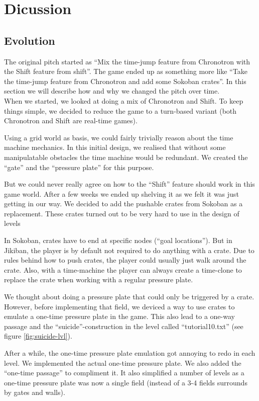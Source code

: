\section{Dicussion} 

\subsection{Evolution}
The original pitch started as ``Mix the time-jump feature from
Chronotron with the Shift feature from shift''.  The game ended up as
something more like ``Take the time-jump feature from Chronotron and
add some Sokoban crates''.  In this section we will describe how and why
we changed the pitch over time.\\


When we started, we looked at doing a mix of Chronotron and Shift.  To
keep things simple, we decided to reduce the game to a turn-based
variant (both Chronotron and Shift are real-time games).

Using a grid world as basis, we could fairly trivially reason about
the time machine mechanics.  In this initial design, we realised that
without some manipulatable obstacles the time machine would be
redundant.  We created the ``gate'' and the ``pressure plate'' for
this purpose.

But we could never really agree on how to the ``Shift'' feature should
work in this game world.  After a few weeks we ended up shelving it as
we felt it was just getting in our way.  We decided to add the
pushable crates from Sokoban as a replacement.  These crates turned out
to be very hard to use in the design of levels

In Sokoban, crates have to end at specific nodes (``goal locations'').
But in Jikiban, the player is by default not required to do anything
with a crate.  Due to rules behind how to push crates, the player
could usually just walk around the crate.  Also, with a time-machine
the player can always create a time-clone to replace the crate when
working with a regular pressure plate.

We thought about doing a pressure plate that could only be triggered
by a crate.  However, before implementing that field, we deviced a way
to use crates to emulate a one-time pressure plate in the game.  This
also lead to a one-way passage and the ``suicide''-construction in the
level called ``tutorial10.txt'' (see figure \ref{fig:suicide-lvl}).

After a while, the one-time pressure plate emulation got annoying to
redo in each level.  We implemented the actual one-time pressure
plate. We also added the ``one-time passage'' to compliment it.  It
also simplified a number of levels as a one-time pressure plate was
now a single field (instead of a 3-4 fields surrounds by gates and
walls).

